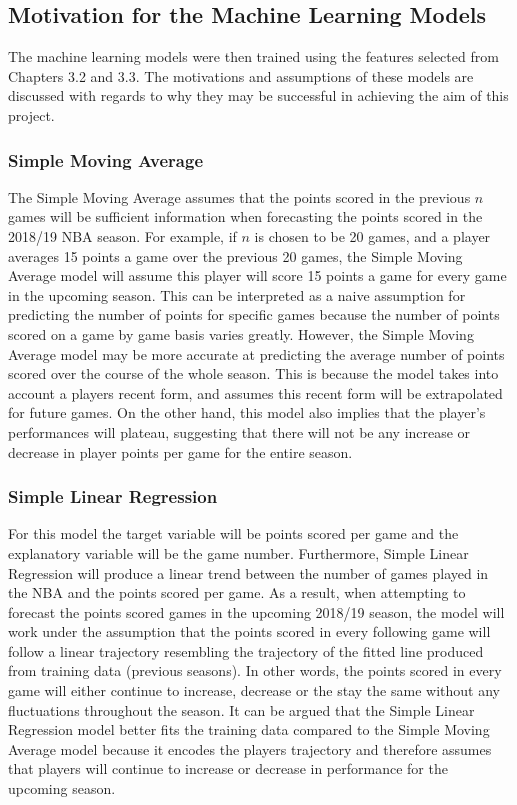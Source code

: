 \documentclass[a4paper,11pt,twoside]{article}
\begin{document}
\subsection{Motivation for the Machine Learning Models} 

The machine learning models were then trained using the features selected from Chapters 3.2 and 3.3. The motivations and assumptions of these models are discussed with regards to why they may be successful in achieving the aim of this project.

\subsubsection{Simple Moving Average}

The Simple Moving Average assumes that the points scored in the previous $n$ games will be sufficient information when forecasting the points scored in the 2018/19 NBA season. For example, if $n$ is chosen to be 20 games, and a player averages 15 points a game over the previous 20 games, the Simple Moving Average model will assume this player will score 15 points a game for every game in the upcoming season. This can be interpreted as a naive assumption for predicting the number of points for specific games because the number of points scored on a game by game basis varies greatly. However, the Simple Moving Average model may be more accurate at predicting the average number of points scored over the course of the whole season. This is because the model takes into account a players recent form, and assumes this recent form will be extrapolated for future games. On the other hand, this model also implies that the player's performances will plateau, suggesting that there will not be any increase or decrease in player points per game for the entire season. 


\subsubsection{Simple Linear Regression}

For this model the target variable will be points scored per game and the explanatory variable will be the game number. Furthermore, Simple Linear Regression will produce a linear trend between the number of games played in the NBA and the points scored per game. As a result, when attempting to forecast the points scored games in the upcoming 2018/19 season, the model will work under the assumption that the points scored in every following game will follow a linear trajectory resembling the trajectory of the fitted line produced from training data (previous seasons). In other words, the points scored in every game will either continue to increase, decrease or the stay the same without any fluctuations throughout the season. It can be argued that the Simple Linear Regression model better fits the training data compared to the Simple Moving Average model because it encodes the players trajectory and therefore assumes that players will continue to increase or decrease in performance for the upcoming season.
\end{document}
